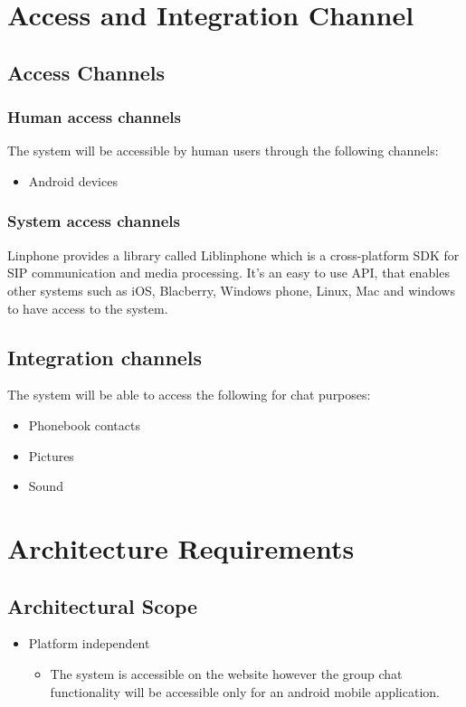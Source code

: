 \documentclass[a4paper]{article}
\begin{document}
\section{\textbf{Access and Integration Channel}}
	\subsection{Access Channels}
	\subsubsection{Human access channels}
	The system will be accessible by human users through the following channels:
	\begin{itemize}
	\item Android devices
	\end{itemize}

	\subsubsection{System access channels}
	Linphone provides a library called Liblinphone which is a cross-platform SDK for SIP communication and media processing. It's an easy to use API, that enables other systems such as iOS, Blacberry, Windows phone, Linux, Mac and windows to have access to the system.
	
	
	\subsection{Integration channels}
	The system will be able to access the following for chat purposes:
	\begin{itemize}
	\item Phonebook contacts
	\item Pictures
	\item Sound
	\end{itemize}
	
	
\section{\textbf{Architecture Requirements}}

\subsection{Architectural Scope}
\begin{itemize}	
		\item Platform independent
			\begin{itemize}
				\item The system is accessible on the website however the group chat functionality will be accessible only for an android mobile application.
			\end{itemize}
\end{itemize}
\end{document}
